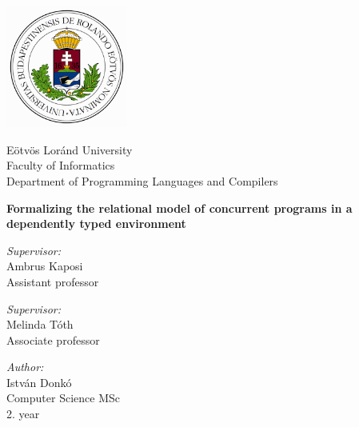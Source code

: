 \documentclass[runningheads,a4paper]{report}
\theoremstyle{definition}
\begin{document}


\begin{titlepage}
  \noindent
  \begin{minipage}{0.25 \textwidth}
    \includegraphics[height=40mm]{figures/cimer.png}
  \end{minipage}
  \hfill
  \begin{minipage}{0.67 \textwidth}
    \large
    Eötvös Loránd University \\
    Faculty of Informatics \\
    Department of Programming Languages and Compilers \\
    
  \end{minipage}

  \vfill

  \begin{center}
    {\LARGE \bfseries Formalizing the relational model of concurrent programs in a dependently typed environment}
    \\[6cm]
    \begin{minipage}[t]{0.45 \textwidth}
      \emph{Supervisor:} \\[0.25 \baselineskip]
      {\large Ambrus Kaposi} \\[0.5 \baselineskip]
      Assistant professor
      \vspace{1cm}
      
      \emph{Supervisor:} \\[0.25 \baselineskip]
      {\large Melinda Tóth} \\[0.5 \baselineskip]
      Associate professor
    \end{minipage}
    \begin{minipage}[t]{0.45 \textwidth}
      \begin{flushright}
        \emph{Author:} \\[0.25 \baselineskip]
        {\large István Donkó} \\[0.5 \baselineskip]
        Computer Science MSc \\ %
        2. year
      \end{flushright}
    \end{minipage}
  \end{center}


\end{titlepage}
\end{document}
